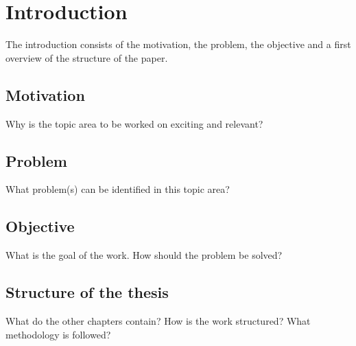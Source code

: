 
\chapter{Introduction}
\label{ch:intro}
The introduction consists of the motivation, the problem, the objective and a first overview of the structure of the paper.

\section{Motivation}
\label{ch:intro:sec:Motivation}

Why is the topic area to be worked on exciting and relevant?

\section{Problem}
\label{ch:intro:sec:problem}

What problem(s) can be identified in this topic area?

\section{Objective}
\label{ch:intro:sec:objective}

What is the goal of the work. How should the problem be solved?


\section{Structure of the thesis}
\label{ch:intro:sec:structure}

What do the other chapters contain? How is the work structured? What methodology is followed?


